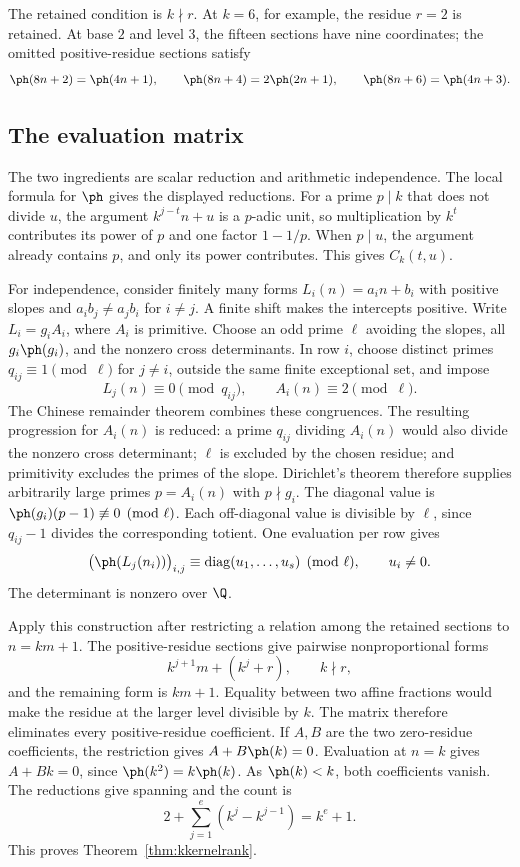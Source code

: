 \label{res:rank}
The retained condition is $k\nmid r$. At $k=6$, for example, the residue
$r=2$ is retained. At base $2$ and level $3$, the fifteen sections have nine
coordinates; the omitted positive-residue sections satisfy
\[
 \ph(8n+2)=\ph(4n+1),\qquad
 \ph(8n+4)=2\ph(2n+1),\qquad
 \ph(8n+6)=\ph(4n+3).
\]

\subsection{The evaluation matrix}\label{sec:rank}
The two ingredients are scalar reduction and arithmetic independence.
The local formula for $\ph$ gives the displayed reductions. For a prime
$p\mid k$ that does not divide $u$, the argument $k^{j-t}n+u$ is a $p$-adic
unit, so multiplication by $k^t$ contributes its power of $p$ and one factor
$1-1/p$. When $p\mid u$, the argument already contains $p$, and only its
power contributes. This gives $C_k(t,u)$.

For independence, consider finitely many forms $L_i(n)=a_in+b_i$ with
positive slopes and $a_ib_j\ne a_jb_i$ for $i\ne j$. A finite shift makes
the intercepts positive. Write $L_i=g_iA_i$, where $A_i$ is primitive.
Choose an odd prime $\ell$ avoiding the slopes, all $g_i\ph(g_i)$, and the
nonzero cross determinants. In row $i$, choose distinct primes
$q_{ij}\equiv1\pmod\ell$ for $j\ne i$, outside the same finite exceptional
set, and impose
\[
 L_j(n)\equiv0\pmod{q_{ij}},\qquad A_i(n)\equiv2\pmod\ell.
\]
The Chinese remainder theorem combines these congruences. The resulting
progression for $A_i(n)$ is reduced: a prime $q_{ij}$ dividing $A_i(n)$
would also divide the nonzero cross determinant; $\ell$ is excluded by the
chosen residue; and primitivity excludes the primes of the slope.
Dirichlet's theorem therefore supplies arbitrarily large primes $p=A_i(n)$
with $p\nmid g_i$. The diagonal value is
$\ph(g_i)(p-1)\not\equiv0\pmod\ell$. Each off-diagonal value is divisible
by $\ell$, since $q_{ij}-1$ divides the corresponding totient.
One evaluation per row gives
\[
 \bigl(\ph(L_j(n_i))\bigr)_{i,j}
 \equiv\operatorname{diag}(u_1,\ldots,u_s)\pmod\ell,
 \qquad u_i\ne0.
\]
The determinant is nonzero over $\Q$.

Apply this construction after restricting a relation among the retained
sections to $n=km+1$. The positive-residue sections give pairwise
nonproportional forms
\[
 k^{j+1}m+(k^j+r),\qquad k\nmid r,
\]
and the remaining form is $km+1$. Equality between two affine fractions
would make the residue at the larger level divisible by $k$. The matrix
therefore eliminates every positive-residue coefficient. If $A,B$ are the
two zero-residue coefficients, the restriction gives
$A+B\ph(k)=0$. Evaluation at $n=k$ gives $A+Bk=0$, since
$\ph(k^2)=k\ph(k)$. As $\ph(k)<k$, both coefficients vanish.
The reductions give spanning and the count is
\[
 2+\sum_{j=1}^e(k^j-k^{j-1})=k^e+1.
\]
This proves Theorem~\ref{thm:kkernelrank}.

